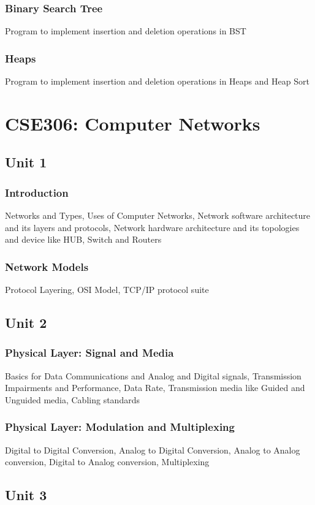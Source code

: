 \documentclass[twocolumn]{article}
\begin{document}
    \subsubsection*{Binary Search Tree}
    Program to implement insertion and deletion operations in BST
    \subsubsection*{Heaps}
    Program to implement insertion and deletion operations in Heaps and Heap Sort
    \section*{CSE306: Computer Networks}
    \subsection*{Unit 1}
    \subsubsection*{Introduction}
    Networks and Types, Uses of Computer Networks, Network software architecture and its layers and protocols, Network hardware architecture and its topologies and device like HUB, Switch and Routers
    \subsubsection*{Network Models}
    Protocol Layering, OSI Model, TCP/IP protocol suite
    \subsection*{Unit 2}
    \subsubsection*{Physical Layer: Signal and Media}
    Basics for Data Communications and Analog and Digital signals, Transmission Impairments and Performance, Data Rate, Transmission media like Guided and Unguided media, Cabling standards
    \subsubsection*{Physical Layer: Modulation and Multiplexing}
    Digital to Digital Conversion, Analog to Digital Conversion, Analog to Analog conversion, Digital to Analog conversion, Multiplexing
    \subsection*{Unit 3}
\end{document}
